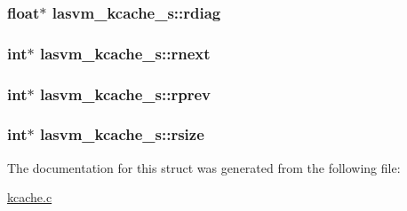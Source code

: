 \hypertarget{structlasvm__kcache__s_aeb1c9c0751894c370f9db656010897a2}{
\subsubsection[{rdiag}]{\setlength{\rightskip}{0pt plus 5cm}float$\ast$ lasvm\+\_\+kcache\+\_\+s\+::rdiag}}\label{structlasvm__kcache__s_aeb1c9c0751894c370f9db656010897a2}
\hypertarget{structlasvm__kcache__s_aa309c64f6bbab6f27100533b7004b5da}{
\subsubsection[{rnext}]{\setlength{\rightskip}{0pt plus 5cm}int$\ast$ lasvm\+\_\+kcache\+\_\+s\+::rnext}}\label{structlasvm__kcache__s_aa309c64f6bbab6f27100533b7004b5da}
\hypertarget{structlasvm__kcache__s_a10711142a92275d73e7af447058176e6}{
\subsubsection[{rprev}]{\setlength{\rightskip}{0pt plus 5cm}int$\ast$ lasvm\+\_\+kcache\+\_\+s\+::rprev}}\label{structlasvm__kcache__s_a10711142a92275d73e7af447058176e6}
\hypertarget{structlasvm__kcache__s_a9bac344d9cc738084353c1a82c18e60d}{
\subsubsection[{rsize}]{\setlength{\rightskip}{0pt plus 5cm}int$\ast$ lasvm\+\_\+kcache\+\_\+s\+::rsize}}\label{structlasvm__kcache__s_a9bac344d9cc738084353c1a82c18e60d}


The documentation for this struct was generated from the following file\+:\begin{DoxyCompactItemize}
\item 
\hyperlink{kcache_8c}{kcache.\+c}\end{DoxyCompactItemize}
